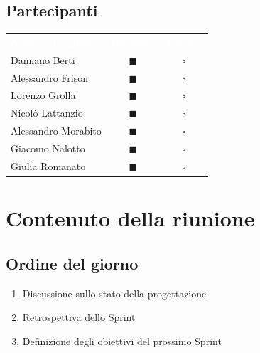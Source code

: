 \documentclass[a4paper, 11pt]{article}
\begin{document}
\subsection{Partecipanti}
\begin{center}
    \begin{tabular}{>{\raggedright\arraybackslash}p{6cm} c c}
        \rowcolor{AccentColor}
        \textcolor{white}{\textbf{Nome e Cognome}} & 
        \textcolor{white}{\textbf{Presente}} & 
        \textcolor{white}{\textbf{Assente}} \\
        
        Damiano Berti     & \textcolor{AccentColor}{$\blacksquare$}    & $\square$        \\
        Alessandro Frison     & \textcolor{AccentColor}{$\blacksquare$}    & $\square$        \\
        Lorenzo Grolla     & \textcolor{AccentColor}{$\blacksquare$}    & $\square$        \\
        Nicolò Lattanzio    & \textcolor{AccentColor}{$\blacksquare$}    & $\square$        \\
        Alessandro Morabito   & \textcolor{AccentColor}{$\blacksquare$}    & $\square$        \\
        Giacomo Nalotto   & \textcolor{AccentColor}{$\blacksquare$}    & $\square$        \\
        Giulia Romanato   & \textcolor{AccentColor}{$\blacksquare$}    & $\square$        \\
    \end{tabular}
\end{center}

\section{Contenuto della riunione}
\subsection{Ordine del giorno}
\begin{enumerate}
    \item Discussione sullo stato della progettazione
    \item Retrospettiva dello Sprint
    \item Definizione degli obiettivi del prossimo Sprint
\end{enumerate}
\newpage
\end{document}
